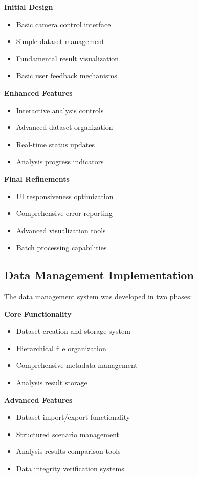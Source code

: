 \textbf{Initial Design}
\begin{itemize}
    \item Basic camera control interface
    \item Simple dataset management
    \item Fundamental result visualization
    \item Basic user feedback mechanisms
\end{itemize}

\textbf{Enhanced Features}
\begin{itemize}
    \item Interactive analysis controls
    \item Advanced dataset organization
    \item Real-time status updates
    \item Analysis progress indicators
\end{itemize}

\textbf{Final Refinements}
\begin{itemize}
    \item UI responsiveness optimization
    \item Comprehensive error reporting
    \item Advanced visualization tools
    \item Batch processing capabilities
\end{itemize}

\subsection{Data Management Implementation}
The data management system was developed in two phases:

\textbf{Core Functionality}
\begin{itemize}
    \item Dataset creation and storage system
    \item Hierarchical file organization
    \item Comprehensive metadata management
    \item Analysis result storage
\end{itemize}

\textbf{Advanced Features}
\begin{itemize}
    \item Dataset import/export functionality
    \item Structured scenario management
    \item Analysis results comparison tools
    \item Data integrity verification systems
\end{itemize}

